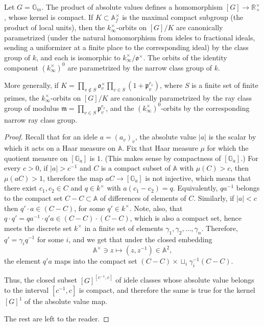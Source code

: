\begin{proposition}
\label{proposition-automorphic-Gm}
 Let $G=\mathbb G_m$. The product of absolute values defines a homomorphism $[G]\to \mathbb R^\times_+$, whose kernel is compact. If $K\subset \mathbb A_f^\times$ is the maximal compact subgroup (the product of local units), then the $k_\infty^\times$-orbits on $[G]/K$ are canonically parametrized (under the natural homomorphism from ideles to fractional ideals, sending a uniformizer at a finite place to the corresponding ideal) by the class group of $k$, and each is isomorphic to $k_\infty^\times / \mathfrak o^\times$. The orbits of the identity component $(k_\infty^\times)^0$ are parametrized by the narrow class group of $k$.
 
 More generally, if $K = \prod_{v\notin S} \mathfrak o_v^\times \prod_{v\in S} (1+\mathfrak p_v^{r_v})$, where $S$ is a finite set of finite primes, the $k_\infty^\times$-orbits on $[G]/K$ are canonically parametrized by the ray class group of modulus $\mathfrak m = \prod_{v\in S} \mathfrak p_v^{r_v}$, and the $(k_\infty^\times)^0$-orbits by the corresponding narrow ray class group.
\end{proposition}

\begin{proof}
 Recall that for an idele $a = (a_v)_v$, the absolute value $|a|$ is the scalar by which it acts on a Haar measure on $\mathbb A$. Fix that Haar measure $\mu$ for which the quotient measure on $[\mathbb G_a]$ is $1$. (This makes sense by compactness of $[\mathbb G_a]$.) For every $c>0$, if $|a|>c^{-1}$ and $C$ is a compact subset of $\mathbb A$ with $\mu(C) >c$, then $\mu(aC)>1$, therefore the map $aC\to [\mathbb G_a]$ is not injective, which means that there exist $c_1, c_2\in C$ and $q\in k^\times$ with $a(c_1-c_2) =q$. Equivalently, $qa^{-1}$ belongs to the compact set $C-C \subset \mathbb A$ of differences of elements of $C$. Similarly, if $|a|<c$ then $q' \cdot a \in (C-C)$, for some $q'\in k^\times$. Note, also, that $q\cdot q' = qa^{-1} \cdot q'a  \in (C-C)\cdot (C-C)$, which is also a compact set, hence meets the discrete set $k^\times $ in a finite set of elements $\gamma_1, \gamma_2, \dots, \gamma_n$. Therefore, $q' = \gamma_i q^{-1}$ for some $i$, and we get that under the closed embedding
 \[ \mathbb A^\times \ni z \mapsto (z, z^{-1}) \in \mathbb A^2,\]
 the element $q'a$ maps into the compact set $(C-C) \times \sqcup_i \gamma_i^{-1}(C-C)$.
 
 Thus, the closed subset $[G]^{[c^{-1}, c]}$ of idele classes whose absolute value belongs to the interval $[c^{-1},c]$ is compact, and therefore the same is true for the kernel $[G]^1$ of the absolute value map.
 
 The rest are left to the reader.
\end{proof}


